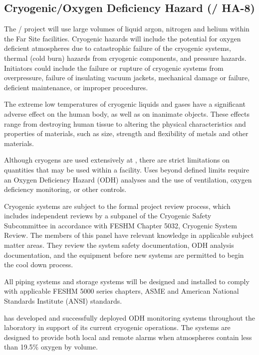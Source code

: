 \subsection{Cryogenic/Oxygen Deficiency Hazard (/ HA-8)}

The / project will use large volumes of liquid argon, nitrogen
and helium within the Far Site facilities. Cryogenic hazards will
include the potential for oxygen deficient atmospheres due to
catastrophic failure of the cryogenic systems, thermal (cold burn)
hazards from cryogenic components, and pressure hazards. Initiators
could include the failure or rupture of cryogenic systems from
overpressure, failure of insulating vacuum jackets, mechanical damage
or failure, deficient maintenance, or improper procedures.

The extreme low temperatures of cryogenic liquids and gases have a
significant adverse effect on the human body, as well as on inanimate
objects. These effects range from destroying human tissue to altering
the physical characteristics and properties of materials, such as
size, strength and flexibility of metals and other materials.

Although cryogens are used extensively at \fnal, there are strict
limitations on quantities that may be used within a facility. Uses
beyond defined limits require an Oxygen Deficiency Hazard (ODH)
analyses and the use of ventilation, oxygen deficiency monitoring, or
other controls.

Cryogenic systems are subject to the formal project review process,
which includes independent reviews by a subpanel of the Cryogenic
Safety Subcommittee in accordance with FESHM Chapter 5032, Cryogenic
System Review. The members of this panel have relevant knowledge in
applicable subject matter areas. They review the system safety
documentation, ODH analysis documentation, and the equipment before
new systems are permitted to begin the cool down process.

All piping systems and storage systems will be designed and installed
to comply with applicable FESHM 5000 series chapters, ASME and
American National Standards Institute (ANSI) standards.

\fnal has developed and successfully deployed ODH monitoring systems throughout the laboratory in support of its current cryogenic operations. The systems are designed to provide both local and remote alarms when atmospheres contain less than 19.5\% oxygen by volume.

